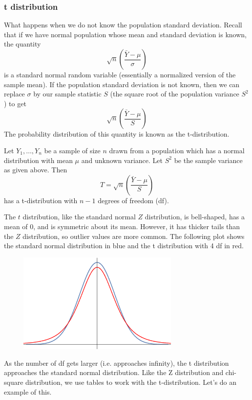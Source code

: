 \documentclass[12pt]{article}
\theoremstyle{definition}
\theoremstyle{remark}
\begin{document}
\subsubsection{t distribution}
What happens when we do not know the population standard deviation. Recall that if we have normal population whose mean and standard deviation is known, the quantity
\[
\sqrt{n}\left( \frac{\bar{Y} - \mu}{\sigma }\right)
\] 
is a standard normal random variable (essentially a normalized version of the sample mean). If the population standard deviation is not known, then we can replace $\sigma$ by our sample statistic $S$ (the square root of the population variance $S^2$) to get
\[
\sqrt{n}\left( \frac{\bar{Y} - \mu}{ S }\right)
\]
The probability distribution of this quantity is known as the t-distribution.
\begin{framed}
Let $Y_1, \dots, Y_n$ be a sample of size $n$ drawn from a population which has a normal distribution with mean $\mu$ and unknown variance. Let $S^2$ be the sample variance as given above. Then
\[
T = \sqrt{n}\left( \frac{\bar{Y} - \mu}{ S }\right)
\]
has a t-distribution with $n-1$ degrees of freedom (df).
\end{framed}
The $t$ distribution, like the standard normal $Z$ distribution, is bell-shaped, has a mean of 0, and is symmetric about its mean. However, it has thicker tails than the $Z$ distribution, so outlier values are more common. The following plot shows the standard normal distribution in blue and the t distribution with 4 df in red.

\begin{figure}[H]
\centering
\includegraphics[width=8cm]{tvsz.eps}
\end{figure}

As the number of df gets larger (i.e. approaches infinity), the t distribution approaches the standard normal distribution. Like the Z distribution and chi-square distribution, we use tables to work with the t-distribution. Let's do an example of this. 
\end{document}
